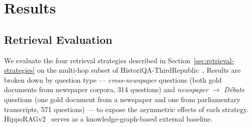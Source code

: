 %


\section{Results}
\label{sec:results}

\subsection{Retrieval Evaluation}
\label{sec:retrieval-results}



We evaluate the four retrieval strategies described in
Section~\ref{sec:retrieval-strategies} on the multi-hop subset of
HistoriQA-ThirdRepublic~\cite{historiqa}.
Results are broken down by question type — \textit{cross-newspaper} questions (both
gold documents from newspaper corpora, 314 questions) and
\textit{newspaper $\rightarrow$ Débats} questions (one gold document from a newspaper
and one from parliamentary transcripts, 571 questions) — to expose the asymmetric
effects of each strategy.
HippoRAGv2~\cite{hipporag} serves as a knowledge-graph-based external baseline.


